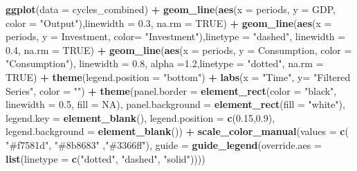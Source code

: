 \documentclass[
]{article}
\newenvironment{Shaded}{\begin{snugshade}}{\end{snugshade}}
\newcommand{\AttributeTok}[1]{\textcolor[rgb]{0.13,0.29,0.53}{#1}}
\newcommand{\ConstantTok}[1]{\textcolor[rgb]{0.56,0.35,0.01}{#1}}
\newcommand{\FloatTok}[1]{\textcolor[rgb]{0.00,0.00,0.81}{#1}}
\newcommand{\FunctionTok}[1]{\textcolor[rgb]{0.13,0.29,0.53}{\textbf{#1}}}
\newcommand{\NormalTok}[1]{#1}
\newcommand{\SpecialCharTok}[1]{\textcolor[rgb]{0.81,0.36,0.00}{\textbf{#1}}}
\newcommand{\StringTok}[1]{\textcolor[rgb]{0.31,0.60,0.02}{#1}}
\begin{document}
\begin{Shaded}
\begin{Highlighting}[]
\FunctionTok{ggplot}\NormalTok{(}\AttributeTok{data =}\NormalTok{ cycles\_combined) }\SpecialCharTok{+}
  \FunctionTok{geom\_line}\NormalTok{(}\FunctionTok{aes}\NormalTok{(}\AttributeTok{x =}\NormalTok{ periods, }\AttributeTok{y =}\NormalTok{ GDP, }\AttributeTok{color =} \StringTok{"Output"}\NormalTok{),}\AttributeTok{linewidth =} \FloatTok{0.3}\NormalTok{, }\AttributeTok{na.rm =} \ConstantTok{TRUE}\NormalTok{) }\SpecialCharTok{+}
  \FunctionTok{geom\_line}\NormalTok{(}\FunctionTok{aes}\NormalTok{(}\AttributeTok{x =}\NormalTok{ periods, }\AttributeTok{y =}\NormalTok{ Investment, }\AttributeTok{color=} \StringTok{"Investment"}\NormalTok{),}\AttributeTok{linetype =} \StringTok{"dashed"}\NormalTok{, }\AttributeTok{linewidth =} \FloatTok{0.4}\NormalTok{, }\AttributeTok{na.rm =} \ConstantTok{TRUE}\NormalTok{) }\SpecialCharTok{+}
  \FunctionTok{geom\_line}\NormalTok{(}\FunctionTok{aes}\NormalTok{(}\AttributeTok{x =}\NormalTok{ periods, }\AttributeTok{y =}\NormalTok{ Consumption, }\AttributeTok{color =} \StringTok{"Consumption"}\NormalTok{), }\AttributeTok{linewidth =} \FloatTok{0.8}\NormalTok{, }\AttributeTok{alpha =}\FloatTok{1.2}\NormalTok{,}\AttributeTok{linetype =} \StringTok{"dotted"}\NormalTok{, }\AttributeTok{na.rm =} \ConstantTok{TRUE}\NormalTok{) }\SpecialCharTok{+}
  \FunctionTok{theme}\NormalTok{(}\AttributeTok{legend.position =} \StringTok{"bottom"}\NormalTok{) }\SpecialCharTok{+} 
  \FunctionTok{labs}\NormalTok{(}\AttributeTok{x =} \StringTok{"Time"}\NormalTok{, }\AttributeTok{y=} \StringTok{"Filtered Series"}\NormalTok{, }\AttributeTok{color =} \StringTok{""}\NormalTok{) }\SpecialCharTok{+}
  \FunctionTok{theme}\NormalTok{(}\AttributeTok{panel.border =} \FunctionTok{element\_rect}\NormalTok{(}\AttributeTok{color =} \StringTok{"black"}\NormalTok{, }\AttributeTok{linewidth =} \FloatTok{0.5}\NormalTok{, }\AttributeTok{fill =} \ConstantTok{NA}\NormalTok{),}
        \AttributeTok{panel.background =} \FunctionTok{element\_rect}\NormalTok{(}\AttributeTok{fill =} \StringTok{"white"}\NormalTok{),}
        \AttributeTok{legend.key =} \FunctionTok{element\_blank}\NormalTok{(),}
        \AttributeTok{legend.position =} \FunctionTok{c}\NormalTok{(}\FloatTok{0.15}\NormalTok{,}\FloatTok{0.9}\NormalTok{),}
        \AttributeTok{legend.background =} \FunctionTok{element\_blank}\NormalTok{()) }\SpecialCharTok{+}
  \FunctionTok{scale\_color\_manual}\NormalTok{(}\AttributeTok{values =} \FunctionTok{c}\NormalTok{(  }\StringTok{"\#f7581d"}\NormalTok{, }\StringTok{"\#8b8683"}\NormalTok{ ,}\StringTok{"\#3366ff"}\NormalTok{),}
                     \AttributeTok{guide =} \FunctionTok{guide\_legend}\NormalTok{(}\AttributeTok{override.aes =} \FunctionTok{list}\NormalTok{(}\AttributeTok{linetype =} \FunctionTok{c}\NormalTok{(}\StringTok{"dotted"}\NormalTok{, }\StringTok{"dashed"}\NormalTok{, }\StringTok{"solid"}\NormalTok{))))}
\end{Highlighting}
\end{Shaded}
\end{document}
